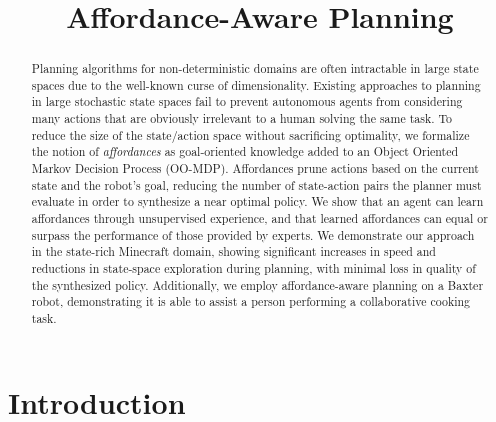 \documentclass[conference]{IEEEtran}
\begin{document}
\title{Affordance-Aware Planning}

\author{
}

\maketitle

\begin{abstract}
Planning algorithms for non-deterministic domains are often
intractable in large state spaces due to the well-known curse of
dimensionality. Existing approaches to planning in large stochastic
state spaces fail to prevent autonomous agents from considering many
actions that are obviously irrelevant to a human solving the same
task. To reduce the size of the state/action space without sacrificing
optimality, we formalize the notion of {\em affordances} as
goal-oriented knowledge added to an Object Oriented Markov Decision
Process (OO-MDP).  Affordances prune actions based on the current
state and the robot's goal, reducing the number of state-action pairs
the planner must evaluate in order to synthesize a near optimal
policy. We show that an agent can learn affordances through
unsupervised experience, and that learned affordances can equal or
surpass the performance of those provided by experts. We demonstrate
our approach in the state-rich Minecraft domain, showing significant
increases in speed and reductions in state-space exploration during
planning, with minimal loss in quality of the synthesized policy.
Additionally, we employ affordance-aware planning on a Baxter robot,
demonstrating it is able to assist a person performing a collaborative
cooking task.

\end{abstract}

\IEEEpeerreviewmaketitle

\section{Introduction}
\label{sec:introduction}
\end{document}
